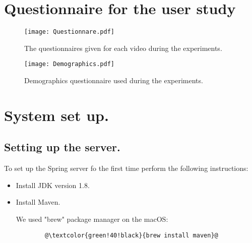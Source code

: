 \chapter{Questionnaire for the user study}
\label{ch:questionnaire-for-the-user-study}
\begin{figure}[hbt!]
    \centering
    \texttt{[image: Questionnare.pdf]}
    \caption{The questionnaires given for each video during the experiments.}
    \label{fig:Questionnare}
\end{figure}

\begin{figure}[hbt!]
    \centering
    \texttt{[image: Demographics.pdf]}
    \caption{Demographics questionnaire used during the experiments.}
    \label{fig:Questionnare}
\end{figure}

\chapter{System set up.}
\label{ch:the-instructions-of-the-system.}

\section{Setting up the server.}
\label{sec:setting-up-the-server.}
To set up the Spring server fo the first time perform the following instructions:
\begin{itemize}
    \item Install JDK version 1.8.
    \item Install Maven.

    We used "brew" package manager on the macOS:
    \begin{lstlisting}
        @\textcolor{green!40!black}{brew install maven}@
    \end{lstlisting}
\end{itemize}
